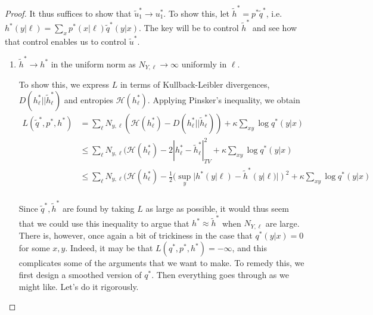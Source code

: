 \begin{proof}
It thus suffices to show that $\tilde u_1^* \rightarrow u_1^*$.  To show this, let $\tilde h^* =p^*\tilde q^*$,
i.e. $h^*(y|\ell)=\sum_x p^*(x|\ell)\tilde q^*(y|x)$.  The key will be to control $\tilde h^*$ and see how that control
enables us to control $\tilde u^*$.

\begin{enumerate}
\item $\tilde h^* \rightarrow h^*$ in the uniform norm as 
$N_{Y,\ell}\rightarrow\infty$ uniformly in $\ell$.

To show this, we express $L$ in terms of 
Kullback-Leibler divergences, $D(h^*_\ell||\tilde h^*_\ell)$ and entropies 
$\mathcal H(h^*_\ell)$.  Applying Pinsker's inequality, we obtain
%
\begin{align*}
L(\tilde q^*,p^*,h^*) &= \sum_\ell N_{y,\ell} (\mathcal H(h^*_\ell) - D(h^*_\ell||\tilde h^*_\ell)) + \kappa \sum_{xy} \log q^*(y|x)\\
&\leq \sum_\ell N_{y,\ell} (\mathcal H(h^*_\ell) - 2|h^*_\ell-\tilde h^*_\ell|^2_{TV} + \kappa \sum_{xy} \log q^*(y|x)\\
&\leq \sum_\ell N_{y,\ell} (\mathcal H(h^*_\ell) - \frac{1}{2}(\sup_y |h^*(y|\ell)-\tilde h^*(y|\ell)|)^2 + \kappa \sum_{xy} \log q^*(y|x)\\
\end{align*}

Since $\tilde q^*,\tilde h^*$ are found by taking $L$ as large as possible, it would thus seem that we could use
this inequality to argue that $h^* \approx \tilde h^*$ when $N_{Y,\ell}$ are large.  There is, however, once again 
a bit of trickiness in the case that $q^*(y|x)=0$ for some $x,y$.  Indeed, it may be that $L(q^*,p^*,h^*)=-\infty$,
and this complicates some of the arguments that we want to make.   To remedy this, we first design a smoothed
version of $q^*$.  Then everything goes through as we might like.  Let's do it rigorously.


\end{enumerate}
\end{proof}
